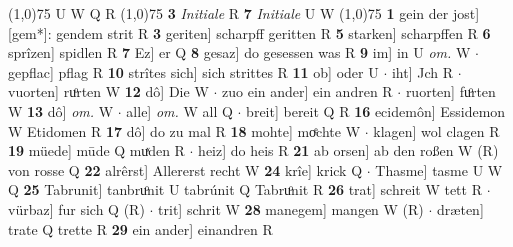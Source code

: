 \documentclass[8pt,a4paper,notitlepage]{article}
\begin{document}
\begin{table}[ht]
\begin{minipage}[t]{0.5\linewidth}
\scriptsize
\line(1,0){75} \newline
U W Q R \newline
\line(1,0){75} \newline
\textbf{3} \textit{Initiale} R  \textbf{7} \textit{Initiale} U W  \newline
\line(1,0){75} \newline
\textbf{1} gein der jost] [gem*]: gendem strit R \textbf{3} geriten] scharpff geritten R \textbf{5} starken] scharpffen R \textbf{6} sprîzen] spidlen R \textbf{7} Ez] er Q \textbf{8} gesaz] do gesessen was R \textbf{9} im] in U \textit{om.} W  $\cdot$ gepflac] pflag R \textbf{10} strîtes sich] sich strittes R \textbf{11} ob] oder U  $\cdot$ iht] Jch R  $\cdot$ vuorten] ruͦrten W \textbf{12} dô] Die W  $\cdot$ zuo ein ander] ein andren R  $\cdot$ ruorten] fuͦrten W \textbf{13} dô] \textit{om.} W  $\cdot$ alle] \textit{om.} W all Q  $\cdot$ breit] bereit Q R \textbf{16} ecidemôn] Essidemon W Etidomen R \textbf{17} dô] do zu mal R \textbf{18} mohte] moͤchte W  $\cdot$ klagen] wol clagen R \textbf{19} müede] mūde Q muͯden R  $\cdot$ heiz] do heis R \textbf{21} ab orsen] ab den roßen W (R) von rosse Q \textbf{22} alrêrst] Allererst recht W \textbf{24} krîe] krick Q  $\cdot$ Thasme] tasme U W Q \textbf{25} Tabrunit] tanbruͦnit U tabrúnit Q Tabruͦnit R \textbf{26} trat] schreit W tett R  $\cdot$ vürbaz] fur sich Q (R)  $\cdot$ trit] schrit W \textbf{28} manegem] mangen W (R)  $\cdot$ dræten] trate Q trette R \textbf{29} ein ander] einandren R \newline
\end{minipage}
\end{table}
\end{document}
